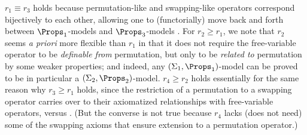 \textit{%
	$r_1 \equiv r_3$}
holds because  permutation-like and swapping-like operators 
correspond bijectively to each other, allowing one to (functorially) move back and forth between $\Props_1$-models and $\Props_3$-models \cite[Section 6.1]{pitts_2013}. 
%
For $r_2 \geq r_1$, we note that 
$r_2$ seems \emph{a priori} more flexible than $r_1$ in that it does not require the free-variable operator to be \emph{definable from} permutation, but only to be \emph{related to} permutation by some weaker properties; and indeed, 
any 
$(\Sigma_1,\Props_1)$-model can be proved to be in particular a $(\Sigma_2,\Props_2)$-model. 
%
%
\textit{%
	$r_4\geq r_2$} %
holds essentially for the same reason why $r_3\geq r_1$ holds, 
since the restriction of a permutation to a swapping operator carries over to their axiomatized relationships with free-variable operators,  \PmFv{} versus \SwFv{}. (But the converse is not true because $r_4$ lacks (does not need) some of the swapping axioms that ensure extension to a permutation operator.) 
